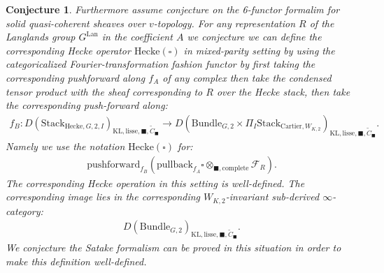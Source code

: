 \documentclass[12pt]{book}
\newtheorem{conjecture}{Conjecture}
\theoremstyle{definition}
\begin{document}
\begin{conjecture}
Furthermore assume conjecture on the 6-functor formalim for solid quasi-coherent sheaves over $v$-topology. For any representation $R$ of the Langlands group $G^\mathrm{Lan}$ in the coefficient $A$ we conjecture we can define the corresponding Hecke operator $\mathrm{Hecke}(\square)$ in mixed-parity setting by using the categoricalized Fourier-transformation fashion functor by first taking the corresponding pushforward along $f_A$ of any complex then take the condensed tensor product with the sheaf corresponding to $R$ over the Hecke stack, then take the corresponding push-forward along:
\begin{align}
f_B: D(\mathrm{Stack}_{\mathrm{Hecke},G,2,I})_{\text{KL},\mathrm{lisse},\blacksquare,\widetilde{C}_\blacksquare} \rightarrow D(\mathrm{Bundle}_{G,2}\times \Pi_I \mathrm{Stack}_{\mathrm{Cartier},W_{K,2}})_{\text{KL},\mathrm{lisse},\blacksquare,\widetilde{C}_\blacksquare}.
\end{align}
Namely we use the notation $\mathrm{Hecke}(\square)$ for:
\begin{align}
\mathrm{pushforward}_{f_B}(\mathrm{pullback}_{f_A}\square\otimes_{\blacksquare,\mathrm{complete}}\mathcal{F}_R).
\end{align}
The corresponding Hecke operation in this setting is well-defined. The corresponding image lies in the corresponding $W_{K,2}$-invariant sub-derived $\infty$-category:
\begin{align}
D(\mathrm{Bundle}_{G,2})_{\text{KL},\mathrm{lisse},\blacksquare,\widetilde{C}_\blacksquare}.
\end{align}
We conjecture the Satake formalism can be proved in this situation in order to make this definition well-defined.
\end{conjecture}
\end{document}
